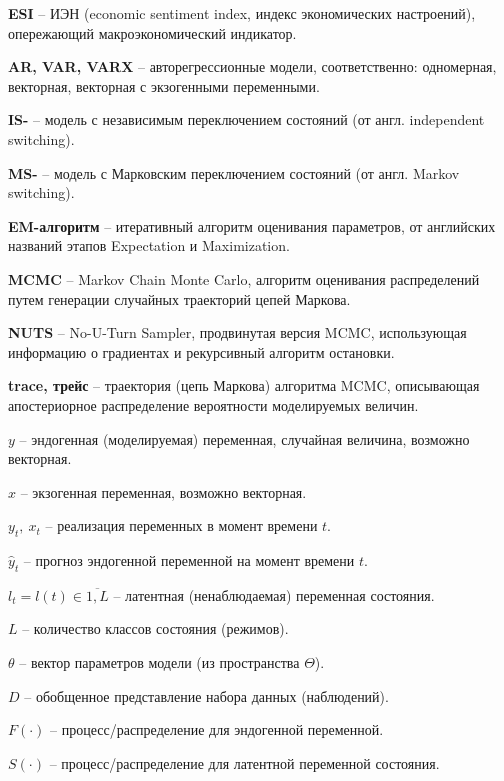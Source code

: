 \documentclass[a4paper,14pt]{extreport}
\begin{document}
\textbf{ESI} -- ИЭН (economic sentiment index, индекс экономических настроений), опережающий макроэкономический индикатор.

\textbf{AR, VAR, VARX} -- авторегрессионные модели, соответственно: одномерная, векторная, векторная с экзогенными переменными.

\textbf{IS-} -- модель с независимым переключением состояний (от англ. independent switching).

\textbf{MS-} -- модель с Марковским переключением состояний (от англ. Markov switching).

\textbf{EM-алгоритм} -- итеративный алгоритм оценивания параметров, от английских названий этапов Expectation и Maximization.

\textbf{MCMC} -- Markov Chain Monte Carlo, алгоритм оценивания распределений путем генерации случайных траекторий цепей Маркова.

\textbf{NUTS} -- No-U-Turn Sampler, продвинутая версия MCMC, использующая информацию о градиентах и рекурсивный алгоритм остановки.

\textbf{trace, трейс} -- траектория (цепь Маркова) алгоритма MCMC, описывающая апостериорное распределение вероятности моделируемых величин.



$y$ -- эндогенная (моделируемая) переменная, случайная величина, возможно векторная.

$x$ -- экзогенная переменная, возможно векторная.

$y_t, \: x_t$ -- реализация переменных в момент времени $t$.

$\hat{y}_t$ -- прогноз эндогенной переменной на момент времени $t$.

$l_t = l(t) \in \overline{1,L}$ -- латентная (ненаблюдаемая) переменная состояния.

$L$ -- количество классов состояния (режимов).

$\theta$ -- вектор параметров модели (из пространства $\Theta$).

$D$ -- обобщенное представление набора данных (наблюдений).

$F(\cdot)$ -- процесс/распределение для эндогенной переменной.

$S(\cdot)$ -- процесс/распределение для латентной переменной состояния.



\end{document}
